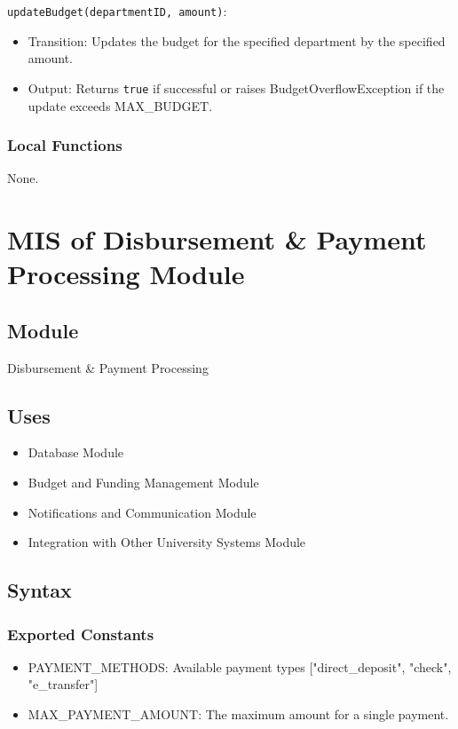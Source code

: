 \documentclass[12pt, titlepage]{article}
\begin{document}
\noindent \texttt{updateBudget(departmentID, amount)}:
\begin{itemize}
    \item Transition: Updates the budget for the specified department by the specified amount.
    \item Output: Returns \texttt{true} if successful or raises BudgetOverflowException if the update exceeds MAX\_BUDGET.
\end{itemize}

\subsubsection{Local Functions}
None.


\section{MIS of Disbursement \& Payment Processing Module}

\subsection{Module}
Disbursement \& Payment Processing

\subsection{Uses}
\begin{itemize}
    \item Database Module
    \item Budget and Funding Management Module
    \item Notifications and Communication Module
    \item Integration with Other University Systems Module
\end{itemize}

\subsection{Syntax}
\subsubsection{Exported Constants}
\begin{itemize}
    \item PAYMENT\_METHODS: Available payment types ["direct\_deposit", "check", "e\_transfer"]
    \item MAX\_PAYMENT\_AMOUNT: The maximum amount for a single payment.
\end{itemize}
\end{document}
